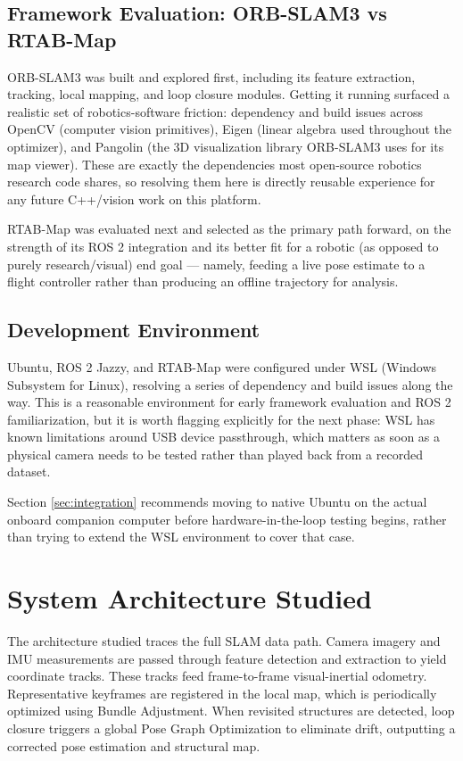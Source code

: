 \documentclass[11pt,a4paper]{article}
\begin{document}
\subsection{Framework Evaluation: ORB-SLAM3 vs RTAB-Map}
ORB-SLAM3 was built and explored first, including its feature extraction, tracking, local mapping, and loop closure modules. Getting it running surfaced a realistic set of robotics-software friction: dependency and build issues across OpenCV (computer vision primitives), Eigen (linear algebra used throughout the optimizer), and Pangolin (the 3D visualization library ORB-SLAM3 uses for its map viewer). These are exactly the dependencies most open-source robotics research code shares, so resolving them here is directly reusable experience for any future C++/vision work on this platform.

RTAB-Map was evaluated next and selected as the primary path forward, on the strength of its ROS 2 integration and its better fit for a robotic (as opposed to purely research/visual) end goal --- namely, feeding a live pose estimate to a flight controller rather than producing an offline trajectory for analysis.

\subsection{Development Environment}
Ubuntu, ROS 2 Jazzy, and RTAB-Map were configured under WSL (Windows Subsystem for Linux), resolving a series of dependency and build issues along the way. This is a reasonable environment for early framework evaluation and ROS 2 familiarization, but it is worth flagging explicitly for the next phase: WSL has known limitations around USB device passthrough, which matters as soon as a physical camera needs to be tested rather than played back from a recorded dataset. 

Section \ref{sec:integration} recommends moving to native Ubuntu on the actual onboard companion computer before hardware-in-the-loop testing begins, rather than trying to extend the WSL environment to cover that case.

\section{System Architecture Studied}
The architecture studied traces the full SLAM data path. Camera imagery and IMU measurements are passed through feature detection and extraction to yield coordinate tracks. These tracks feed frame-to-frame visual-inertial odometry. Representative keyframes are registered in the local map, which is periodically optimized using Bundle Adjustment. When revisited structures are detected, loop closure triggers a global Pose Graph Optimization to eliminate drift, outputting a corrected pose estimation and structural map.
\end{document}
